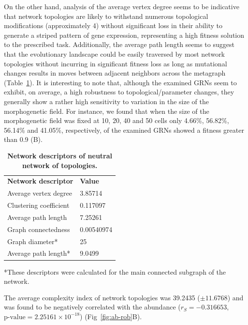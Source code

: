 \documentclass[10pt,letterpaper]{article}
\newlength\savedwidth
\newcommand\thickhline{\noalign{\global\savedwidth\arrayrulewidth\global\arrayrulewidth 2pt}%
\hline
\noalign{\global\arrayrulewidth\savedwidth}}
\begin{document}
On the other hand, analysis of the average vertex degree seems to be indicative
that network topologies are likely to withstand numerous topological
modifications (approximately 4) without significant loss in their ability to
generate a striped pattern of gene expression, representing a high fitness
solution to the prescribed task. Additionally, the average path length seems
to suggest that the evolutionary landscape could be easily traversed by
most network topologies without incurring in significant fitness loss as long
as mutational changes results in moves between adjacent neighbors across
the metagraph (Table~\ref{table1}). It is interesting to note that,
although the examined GRNs seem to exhibit, on average, a high robustness to
topological/parameter changes, they generally show a rather high sensitivity to
variation in the size of the morphogenetic field. For instance, we found that
when the size of the morphogenetic field was fixed at 10, 20, 40 and 50 cells
only 4.66\%, 56.82\%, 56.14\% and 41.05\%, respectively, of the examined
GRNs showed a fitness greater than 0.9 (B).

\begin{table}[!ht]
 \centering
 \caption{{\bf Network descriptors of neutral network of topologies.}}
 \begin{tabular}{|l|l|}
 \hline
 {\bf Network descriptor} & {\bf Value}\\ \thickhline
 Average vertex degree  & 3.85714 \\ \hline
 Clustering coefficient~\cite{Watts1998} & 0.117097 \\ \hline
 Average path length    & 7.25261       \\ \hline
 Graph connectedness    & 0.00540974    \\ \hline
 Graph diameter*        & 25            \\ \hline
 Average path length*   & 9.0499        \\ \hline
 \end{tabular}
 \begin{flushleft} *These descriptors were calculated for the main connected
 subgraph of the network.
 \end{flushleft}
 \label{table1}
 \end{table}

The average complexity index of network topologies was 39.2435 ($\pm 11.6768$)
and was found to be negatively correlated with the abundance ($r_S = -0.316653$,
$\text{p-value} = 2.25161\times10^{-18}$) (Fig~\ref{fig:ab-rob}B).
\end{document}
